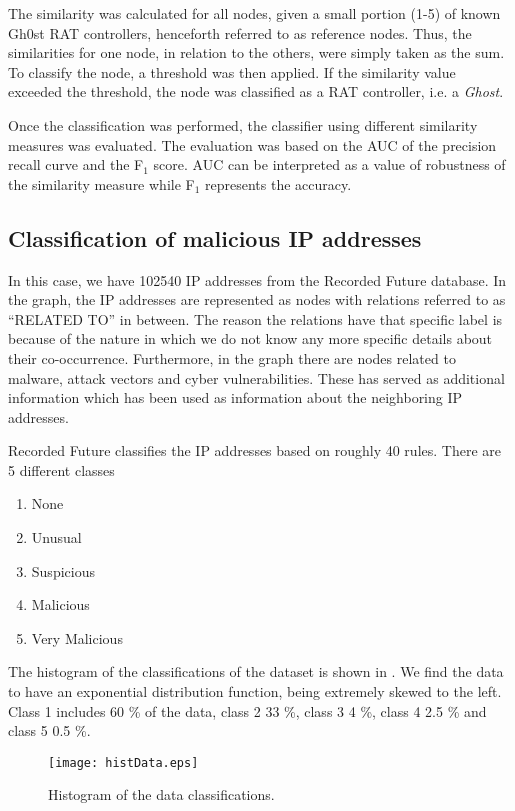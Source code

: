 The similarity was calculated for all nodes, given a small portion (1-5) of known Gh0st RAT controllers, henceforth referred to as reference nodes. Thus, the similarities for one node, in relation to the others, were simply taken as the sum. To classify the node, a threshold was then applied. If the similarity value exceeded the threshold, the node was classified as a RAT controller, i.e. a \textit{Ghost}.

Once the classification was performed, the classifier using different similarity measures was evaluated. The evaluation was based on the AUC of the precision recall curve and the F$_1$ score. AUC can be interpreted as a value of robustness of the similarity measure while F$_1$ represents the accuracy.

\subsection{Classification of malicious IP addresses}
In this case, we have 102540 IP addresses from the Recorded Future database. In the graph, the IP addresses are represented as nodes with relations referred to as ``RELATED TO'' in between. The reason the relations have that specific label is because of the nature in which we do not know any more specific details about their co-occurrence. Furthermore, in the graph there are nodes related to malware, attack vectors and cyber vulnerabilities. These has served as additional information which has been used as information about the neighboring IP addresses.

Recorded Future classifies the IP addresses based on roughly 40 rules. There are 5 different classes
\begin{enumerate}
    \item None
    \item Unusual
    \item Suspicious
    \item Malicious
    \item Very Malicious
\end{enumerate}

The histogram of the classifications of the dataset is shown in . We find the data to have an exponential distribution function, being extremely skewed to the left. Class 1 includes 60 \% of the data, class 2 33 \%, class 3 4 \%, class 4 2.5 \% and class 5 0.5 \%. 

\begin{figure}[h!]
    \centering
    \texttt{[image: histData.eps]}
    \caption{Histogram of the data classifications.}
    \label{hist}
\end{figure}

